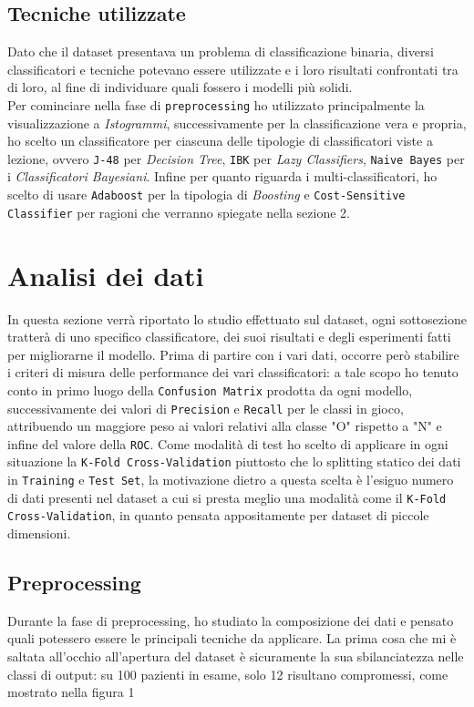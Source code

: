   \subsection{Tecniche utilizzate}
  Dato che il dataset presentava un problema di classificazione binaria, diversi classificatori e tecniche potevano essere utilizzate e i loro risultati confrontati tra di loro, al fine di individuare quali fossero i modelli più solidi.\\
  Per cominciare nella fase di \texttt{preprocessing} ho utilizzato principalmente la visualizzazione a \textit{Istogrammi}, successivamente per la classificazione vera e propria, ho scelto un classificatore per ciascuna delle tipologie di classificatori viste a lezione, ovvero \texttt{J-48} per \textit{Decision Tree}, \texttt{IBK} per \textit{Lazy Classifiers}, \texttt{Naive Bayes} per i \textit{Classificatori Bayesiani}.
  Infine per quanto riguarda i multi-classificatori, ho scelto di usare \texttt{Adaboost} per la tipologia di \textit{Boosting} e \texttt{Cost-Sensitive Classifier} per ragioni che verranno spiegate nella sezione 2.
  \section{Analisi dei dati}
  In questa sezione verrà riportato lo studio effettuato sul dataset, ogni sottosezione tratterà di uno specifico classificatore, dei suoi risultati e degli esperimenti fatti per migliorarne il modello.
  Prima di partire con i vari dati, occorre però stabilire i criteri di misura delle performance dei vari classificatori: a tale scopo ho tenuto conto in primo luogo della \texttt{Confusion Matrix} prodotta da ogni modello, successivamente dei valori di \texttt{Precision} e \texttt{Recall} per le classi in gioco, attribuendo un maggiore peso ai valori relativi alla classe "O" rispetto a "N" e infine del valore della \texttt{ROC}.
  Come modalità di test ho scelto di applicare in ogni situazione la \texttt{K-Fold Cross-Validation} piuttosto che lo splitting statico dei dati in \texttt{Training} e \texttt{Test Set}, la motivazione dietro a questa scelta è l'esiguo numero di dati presenti nel dataset a cui si presta meglio una modalità come il \texttt{K-Fold Cross-Validation}, in quanto pensata appositamente per dataset di piccole dimensioni.
  \subsection{Preprocessing}
  Durante la fase di preprocessing, ho studiato la composizione dei dati e pensato quali potessero essere le principali tecniche da applicare.
  La prima cosa che mi è saltata all'occhio all'apertura del dataset è sicuramente la sua sbilanciatezza nelle classi di output: su 100 pazienti in esame, solo 12 risultano compromessi, come mostrato nella figura 1
  
